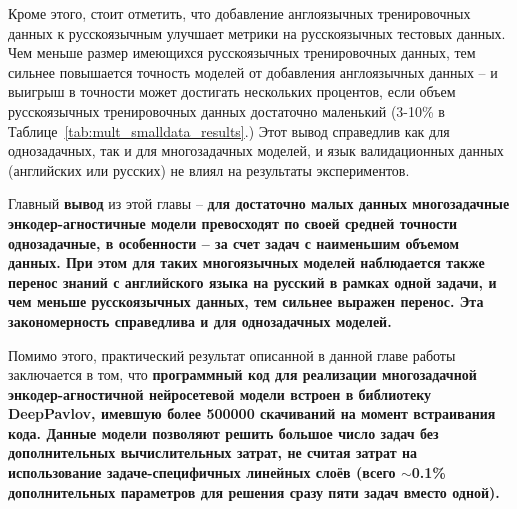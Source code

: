 Кроме этого, стоит отметить, что добавление англоязычных тренировочных данных к русскоязычным улучшает метрики на русскоязычных тестовых данных. Чем меньше размер имеющихся русскоязычных тренировочных данных, тем сильнее повышается точность моделей от добавления англоязычных данных -- и выигрыш в точности может достигать нескольких процентов, если объем русскоязычных тренировочных данных достаточно маленький (3-10\% в Таблице~\ref{tab:mult_smalldata_results}.) Этот вывод справедлив как для однозадачных, так и для многозадачных моделей, и язык валидационных данных (английских или русских) не влиял на результаты экспериментов.

Главный \textbf{вывод} из этой главы -- \textbf{для достаточно малых данных многозадачные энкодер-агностичные модели превосходят по своей средней точности однозадачные, в особенности -- за счет задач с наименьшим объемом данных. При этом для таких многоязычных моделей наблюдается также перенос знаний с английского языка на русский в рамках одной задачи, и чем меньше русскоязычных данных, тем сильнее выражен перенос. Эта закономерность справедлива и для однозадачных моделей.}

Помимо этого, практический результат описанной в данной главе работы заключается в том, что \textbf{программный код для реализации многозадачной энкодер-агностичной нейросетевой модели встроен в библиотеку DeepPavlov, имевшую более 500000 скачиваний на момент встраивания кода. Данные модели позволяют решить большое число задач без дополнительных вычислительных затрат, не считая затрат на использование задаче-специфичных линейных слоёв (всего $\sim$0.1\% дополнительных параметров для решения сразу пяти задач вместо одной).}

